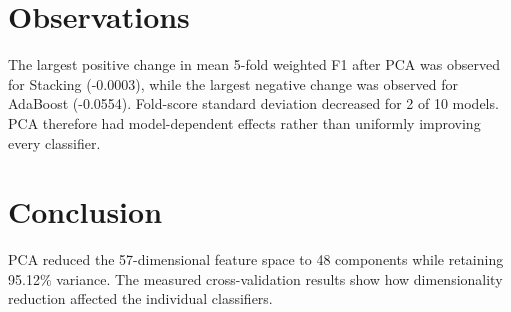 \documentclass[12pt,a4paper]{article}
\begin{document}
\section{Observations} The largest positive change in mean 5-fold weighted F1 after PCA was observed for Stacking (-0.0003), while the largest negative change was observed for AdaBoost (-0.0554). Fold-score standard deviation decreased for 2 of 10 models. PCA therefore had model-dependent effects rather than uniformly improving every classifier.
\section{Conclusion} PCA reduced the 57-dimensional feature space to 48 components while retaining 95.12\% variance. The measured cross-validation results show how dimensionality reduction affected the individual classifiers.
\end{document}
